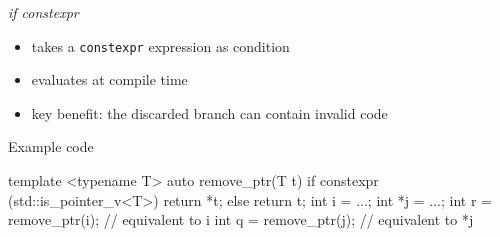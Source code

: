 \begin{frame}[fragile]
  \begin{block}{{\it if constexpr}}
    \begin{itemize}
    \item takes a \texttt{constexpr} expression as condition
    \item evaluates at compile time
    \item key benefit: the discarded branch can contain invalid code
    \end{itemize}
  \end{block}
  \begin{exampleblock}{Example code}
    \small
    \begin{cppcode*}{}
      template <typename T>
      auto remove_ptr(T t) {
        if constexpr (std::is_pointer_v<T>) {
          return *t;
        } else {
          return t;
        }
      }
      int i = ...; int *j = ...;
      int r = remove_ptr(i);  // equivalent to i
      int q = remove_ptr(j);  // equivalent to *j
    \end{cppcode*}
  \end{exampleblock}
\end{frame}
